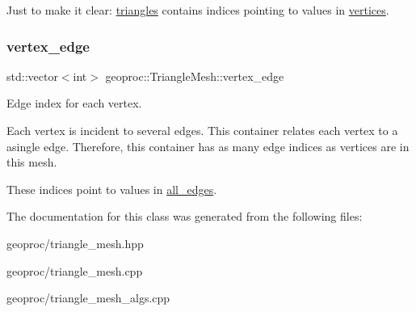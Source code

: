 Just to make it clear\+: \hyperlink{classgeoproc_1_1TriangleMesh_ad1cf20622f2bb080100862f413bd89c2}{triangles} contains indices pointing to values in \hyperlink{classgeoproc_1_1TriangleMesh_a82c3351de37daa9440f53597f080992d}{vertices}. \mbox{\label{classgeoproc_1_1TriangleMesh_abbc25699f67776fc99c909124b0c584a}} 
\subsubsection{\texorpdfstring{vertex\+\_\+edge}{vertex\_edge}}
{\footnotesize\ttfamily std\+::vector$<$int$>$ geoproc\+::\+Triangle\+Mesh\+::vertex\+\_\+edge\hspace{0.3cm}{\ttfamily [protected]}}



Edge index for each vertex. 

Each vertex is incident to several edges. This container relates each vertex to a asingle edge. Therefore, this container has as many edge indices as vertices are in this mesh.

These indices point to values in \hyperlink{classgeoproc_1_1TriangleMesh_ab10f052ad932cd78056a55b58ddd475c}{all\+\_\+edges}. 

The documentation for this class was generated from the following files\+:\begin{DoxyCompactItemize}
\item 
geoproc/triangle\+\_\+mesh.\+hpp\item 
geoproc/triangle\+\_\+mesh.\+cpp\item 
geoproc/triangle\+\_\+mesh\+\_\+algs.\+cpp\end{DoxyCompactItemize}
